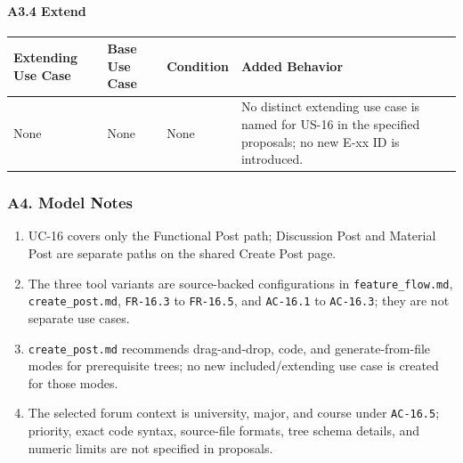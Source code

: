 \documentclass[12pt]{article}
\renewcommand{\baselinestretch}{1.5}
\begin{document}
\hypertarget{sec:a3-4-extend}{}
\paragraph*{A3.4 Extend}
\par\medskip

\begingroup
\small
\renewcommand{\baselinestretch}{1.0}\selectfont
\renewcommand{\arraystretch}{1.15}
\setlength{\tabcolsep}{6pt}
\begin{longtable}{|>{\raggedright\arraybackslash}p{}|>{\raggedright\arraybackslash}p{}|>{\raggedright\arraybackslash}p{}|>{\raggedright\arraybackslash}p{}|}
\hline
\textbf{Extending Use Case} & \textbf{Base Use Case} & \textbf{Condition} & \textbf{Added Behavior} \\ \hline
\endhead
None & None & None & No distinct extending use case is named for US-16 in the specified proposals; no new E-xx ID is introduced. \\ \hline
\end{longtable}
\endgroup
\par\medskip

\hypertarget{sec:a4-model-notes}{}
\subsubsection*{A4. Model Notes}
\par\medskip

\begin{enumerate}
\item UC-16 covers only the Functional Post path; Discussion Post and Material Post are separate paths on the shared Create Post page.
\item The three tool variants are source-backed configurations in \texttt{feature\_flow.md}, \texttt{create\_post.md}, \texttt{FR-16.3} to \texttt{FR-16.5}, and \texttt{AC-16.1} to \texttt{AC-16.3}; they are not separate use cases.
\item \texttt{create\_post.md} recommends drag-and-drop, code, and generate-from-file modes for prerequisite trees; no new included/extending use case is created for those modes.
\item The selected forum context is university, major, and course under \texttt{AC-16.5}; priority, exact code syntax, source-file formats, tree schema details, and numeric limits are not specified in proposals.
\end{enumerate}
\par\medskip
\end{document}
